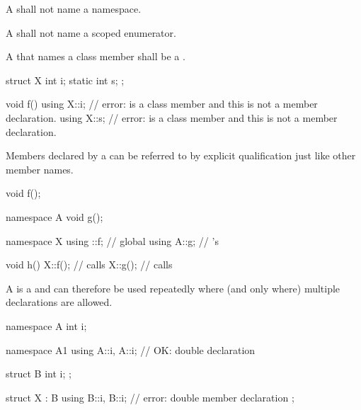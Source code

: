 \pnum
A  shall not name a namespace.

\pnum
A  shall not name a scoped enumerator.

\pnum
A  that names a class member shall be a
.
\begin{example}
\begin{codeblock}
struct X {
  int i;
  static int s;
};

void f() {
  using X::i;                   // error:  is a class member and this is not a member declaration.
  using X::s;                   // error:  is a class member and this is not a member declaration.
}
\end{codeblock}
\end{example}

\pnum
Members declared by a  can be referred to by
explicit qualification just like other member
names.
\begin{example}
\begin{codeblock}
void f();

namespace A {
  void g();
}

namespace X {
  using ::f;                    // global 
  using A::g;                   // 's 
}

void h()
{
  X::f();                       // calls 
  X::g();                       // calls 
}
\end{codeblock}
\end{example}

\pnum
A  is a  and can
therefore be used repeatedly where (and only where) multiple
declarations are allowed.
\begin{example}
\begin{codeblock}
namespace A {
  int i;
}

namespace A1 {
  using A::i, A::i;             // OK: double declaration
}

struct B {
  int i;
};

struct X : B {
  using B::i, B::i;             // error: double member declaration
};
\end{codeblock}
\end{example}

